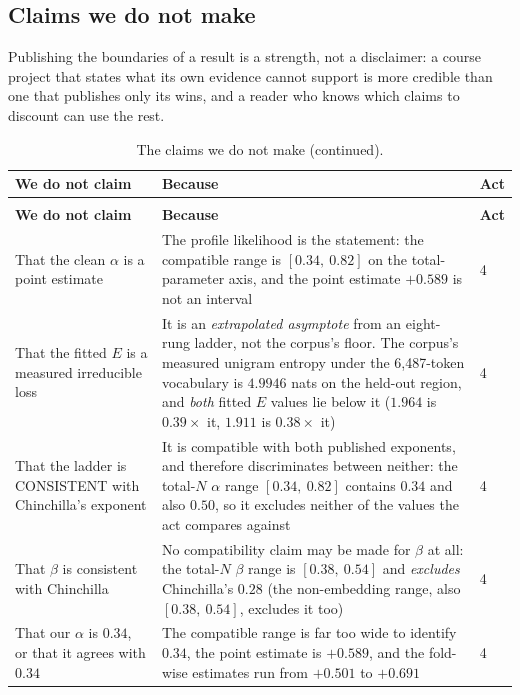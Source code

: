 \documentclass[11pt,a4paper]{article}
\begin{document}
\subsection{Claims we do not make}
\label{sec:dnm}

Publishing the boundaries of a result is a strength, not a disclaimer: a course
project that states what its own evidence cannot support is more credible than
one that publishes only its wins, and a reader who knows which claims to
discount can use the rest.

\begin{longtable}{L{8.0cm}L{4.4cm}L{1.4cm}}
\caption{The claims we do not make, with the reason for each and the act it
belongs to.}\label{tab:dnm}\\
\toprule
\textbf{We do not claim} & \textbf{Because} & \textbf{Act} \\
\midrule
\endfirsthead
\caption[]{The claims we do not make (continued).}\\
\toprule
\textbf{We do not claim} & \textbf{Because} & \textbf{Act} \\
\midrule
\endhead
That the clean $\alpha$ is a point estimate & The profile likelihood is the statement: the compatible range is $[0.34,\ 0.82]$ on the total-parameter axis, and the point estimate $+0.589$ is not an interval & 4 \\
That the fitted $E$ is a measured irreducible loss & It is an \emph{extrapolated asymptote} from an eight-rung ladder, not the corpus's floor. The corpus's measured unigram entropy under the 6,487-token vocabulary is $4.9946$ nats on the held-out region, and \emph{both} fitted $E$ values lie below it ($1.964$ is $0.39\times$ it, $1.911$ is $0.38\times$ it) & 4 \\
That the ladder is CONSISTENT with Chinchilla's exponent & It is compatible with both published exponents, and therefore discriminates between neither: the total-$N$ $\alpha$ range $[0.34,\ 0.82]$ contains $0.34$ and also $0.50$, so it excludes neither of the values the act compares against & 4 \\
That $\beta$ is consistent with Chinchilla & No compatibility claim may be made for $\beta$ at all: the total-$N$ $\beta$ range is $[0.38,\ 0.54]$ and \emph{excludes} Chinchilla's $0.28$ (the non-embedding range, also $[0.38,\ 0.54]$, excludes it too) & 4 \\
That our $\alpha$ is $0.34$, or that it agrees with $0.34$ & The compatible range is far too wide to identify $0.34$, the point estimate is $+0.589$, and the fold-wise estimates run from $+0.501$ to $+0.691$ & 4 \\

\end{longtable}
\end{document}
